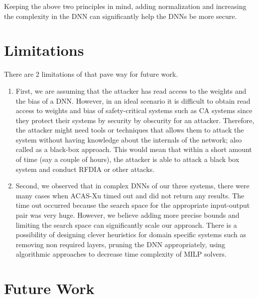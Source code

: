 Keeping the above two principles in mind, adding normalization and increasing the complexity in the \ac{DNN} can significantly help the \ac{DNN}s be more secure. 

\section{ Limitations}

There are 2 limitations of \tool that pave way for future work. 
\begin{enumerate}
	\item First, we are assuming that the attacker has read access to the weights and the bias of a \ac{DNN}.
	However, in an ideal scenario it is difficult to obtain read access to weights and bias of safety-critical systems such as \ac{CA} systems since they protect their systems by security by obscurity  for an attacker. 
	Therefore, the attacker might need tools or techniques that allows them to attack the system without having knowledge about the internals of the network; also called as a black-box approach. 
	This would mean that within a short amount of time (say a couple of hours), the attacker is able to attack a black box system and conduct \ac{RFDIA} or other attacks. 
	\item Second, we observed that in complex \ac{DNN}s of our three systems, there were many cases when  \ac{ACAS-Xu} timed out and did not return any results. 
	The time out occurred because the search space for the appropriate input-output pair was very huge. 
	However, we believe adding more precise bounds and limiting the search space can significantly scale our approach. 
	There is a possibility of designing clever heuristics for domain specific systems such as removing non required layers, pruning the \ac{DNN} appropriately, using algorithmic approaches to decrease time complexity of \ac{MILP} solvers. 
	
	\label{section:limitations}
	
\end{enumerate}

\section{ Future Work}

